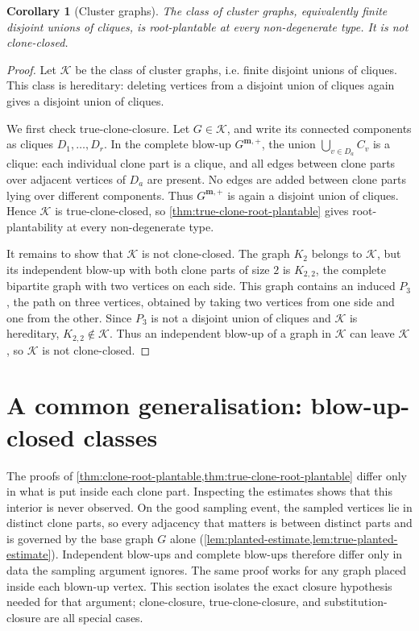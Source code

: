\documentclass[11pt]{article}
\newtheorem{corollary}[corollary]{Corollary}
\theoremstyle{definition}
\newcommand{\K}{\mathcal{K}}
\begin{document}
\begin{corollary}[Cluster graphs]\label{cor:cluster-graphs}
The class of cluster graphs, equivalently finite disjoint unions of cliques, is
root-plantable at every non-degenerate type.  It is not clone-closed.
\end{corollary}

\begin{proof}
Let $\K$ be the class of cluster graphs, i.e. finite disjoint unions of cliques.
This class is hereditary: deleting vertices from a disjoint union of cliques
again gives a disjoint union of cliques.

We first check true-clone-closure.  Let $G\in\K$, and write its connected
components as cliques $D_1,\ldots,D_r$.  In the complete blow-up
$G^{\mathbf m,+}$, the union $\bigcup_{v\in D_a} C_v$ is a clique: each
individual clone part is a clique, and all edges between clone parts over
adjacent vertices of $D_a$ are present.  No edges are added between clone
parts lying over different components.  Thus $G^{\mathbf m,+}$ is again a
disjoint union of cliques.  Hence $\K$ is true-clone-closed, so
\cref{thm:true-clone-root-plantable} gives root-plantability at every
non-degenerate type.

It remains to show that $\K$ is not clone-closed.  The graph $K_2$ belongs to
$\K$, but its independent blow-up with both clone parts of size $2$ is
$K_{2,2}$, the complete bipartite graph with two vertices on each side.  This
graph contains an induced $P_3$, the path on three vertices, obtained by taking
two vertices from one side and one from the other.  Since $P_3$ is not a
disjoint union of cliques and $\K$ is hereditary, $K_{2,2}\notin\K$.  Thus an
independent blow-up of a graph in $\K$ can leave $\K$, so $\K$ is not
clone-closed.
\end{proof}

\section{A common generalisation: blow-up-closed classes}\label{sec:blowup-closed}

The proofs of \cref{thm:clone-root-plantable,thm:true-clone-root-plantable} differ only
in what is put inside each clone part.  Inspecting the estimates shows that this
interior is never observed.  On the good sampling event, the sampled vertices lie in
distinct clone parts, so every adjacency that matters is between distinct parts and is
governed by the base graph $G$ alone
(\cref{lem:planted-estimate,lem:true-planted-estimate}).  Independent blow-ups and
complete blow-ups therefore differ only in data the sampling argument ignores.  The same
proof works for any graph placed inside each blown-up vertex.  This section isolates the
exact closure hypothesis needed for that argument; clone-closure, true-clone-closure,
and substitution-closure are all special cases.
\end{document}

